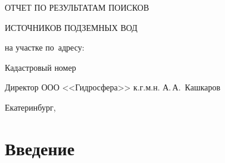 \begin{titlepage}
	\begin{center}
		\textbf{\txtExecutor}
		\vspace{7.5cm}
		
		{\LARGE ОТЧЕТ ПО РЕЗУЛЬТАТАМ ПОИСКОВ}

		\bigskip

		{\LARGE ИСТОЧНИКОВ ПОДЗЕМНЫХ ВОД}
		
		\bigskip
		
		на участке по~адресу:
				
		\underline{\txtAddress}
		
		\bigskip
		Кадастровый номер \txtCadaster
		
		\vfill
	
		\bigskip
		
	\end{center}

	\vfill
	
	\newlength{\ML}
	\hfill
	\begin{minipage}{1.0\textwidth}
		Директор ООО <<Гидросфера>> к.г.м.н.
		\underline{\hspace{\ML}} А.\,А.~Кашкаров\\
	\end{minipage}%
	
	\bigskip
	
	\vfill
	\begin{center}
		Екатеринбург, \txtYear
	\end{center}			

	\end{titlepage}

\tableofcontents

\listoffigures


\bigskip


\newpage

\section{Введение}

